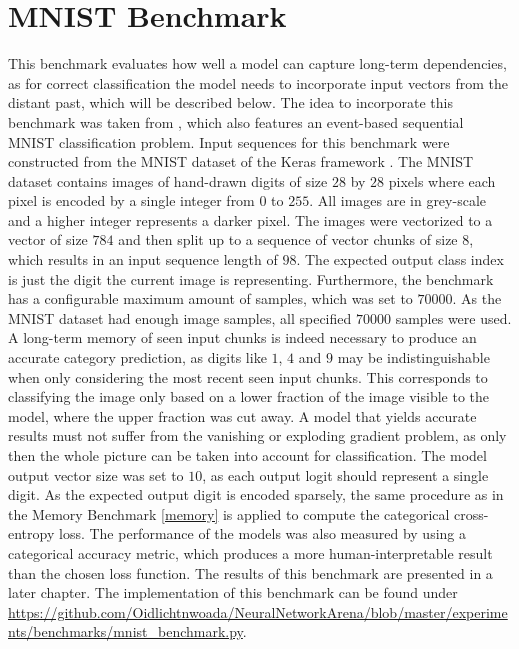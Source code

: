 \documentclass[draft,final]{vutinfth} %
\begin{document}
    \section{MNIST Benchmark} \label{mnist}
    This benchmark evaluates how well a model can capture long-term dependencies, as for correct classification the model needs to incorporate input vectors from the distant past, which will be described below.
    The idea to incorporate this benchmark was taken from \cite{ODELSTM}, which also features an event-based sequential MNIST classification problem.
    Input sequences for this benchmark were constructed from the MNIST dataset of the Keras framework \cite{Keras}.
    The MNIST dataset contains images of hand-drawn digits of size $28$ by $28$ pixels where each pixel is encoded by a single integer from $0$ to $255$.
    All images are in grey-scale and a higher integer represents a darker pixel.
    The images were vectorized to a vector of size $784$ and then split up to a sequence of vector chunks of size $8$, which results in an input sequence length of $98$.
    The expected output class index is just the digit the current image is representing.
    Furthermore, the benchmark has a configurable maximum amount of samples, which was set to $70000$.
    As the MNIST dataset had enough image samples, all specified $70000$ samples were used.
    A long-term memory of seen input chunks is indeed necessary to produce an accurate category prediction, as digits like $1$, $4$ and $9$ may be indistinguishable when only considering the most recent seen input chunks.
    This corresponds to classifying the image only based on a lower fraction of the image visible to the model, where the upper fraction was cut away.
    A model that yields accurate results must not suffer from the vanishing or exploding gradient problem, as only then the whole picture can be taken into account for classification. 
    The model output vector size was set to $10$, as each output logit should represent a single digit.
    As the expected output digit is encoded sparsely, the same procedure as in the Memory Benchmark \ref{memory} is applied to compute the categorical cross-entropy loss.
    The performance of the models was also measured by using a categorical accuracy metric, which produces a more human-interpretable result than the chosen loss function.
    The results of this benchmark are presented in a later chapter.
    The implementation of this benchmark can be found under \url{https://github.com/Oidlichtnwoada/NeuralNetworkArena/blob/master/experiments/benchmarks/mnist_benchmark.py}.
\end{document}
